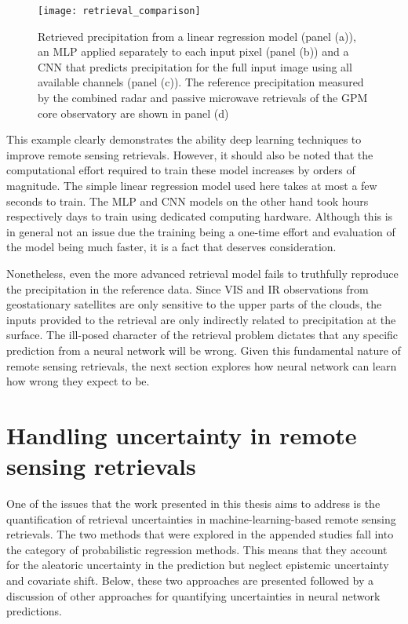 \begin{figure}
  \centering
\texttt{[image: retrieval\_comparison]}
\caption{Retrieved precipitation from a linear regression model
  (panel (a)), an MLP applied separately to each input pixel
  (panel (b)) and a CNN that predicts precipitation for the
  full input image using all available channels (panel (c)).
  The reference precipitation measured by the combined radar
  and passive microwave retrievals of the GPM core observatory
  are shown in panel (d)}
\label{fig:machine_learning:retrieval_comparison}
\end{figure}

This example clearly demonstrates the ability deep learning techniques to
improve remote sensing retrievals. However, it should also be noted that the
computational effort required to train these model increases by orders of
magnitude. The simple linear regression model used here takes at most a few
seconds to train. The MLP and CNN models on the other hand took hours
respectively days to train using dedicated computing hardware. Although this is
in general not an issue due the training being a one-time effort and evaluation
of the model being much faster, it is a fact that deserves consideration.

Nonetheless, even the more advanced retrieval model fails to truthfully
reproduce the precipitation in the reference data. Since VIS and IR observations
from geostationary satellites are only sensitive to the upper parts of the
clouds, the inputs provided to the retrieval are only indirectly related to
precipitation at the surface. The ill-posed character of the retrieval problem
dictates that any specific prediction from a neural network will be wrong. Given
this fundamental nature of remote sensing retrievals, the next section explores
how neural network can learn how wrong they expect to be.


\section{Handling uncertainty in remote sensing retrievals}

One of the issues that the work presented in this thesis aims to address is the
quantification of retrieval uncertainties in machine-learning-based remote
sensing retrievals. The two methods that were explored in the appended studies
fall into the category of probabilistic regression methods. This means that they
account for the aleatoric uncertainty in the prediction but neglect epistemic
uncertainty and covariate shift. Below, these two approaches are presented
followed by a discussion of other approaches for quantifying uncertainties in
neural network predictions.


